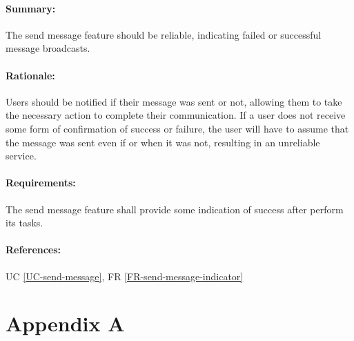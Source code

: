 \documentclass[11pt]{article}
\begin{document}
\paragraph{Summary:} The send message feature should be reliable, indicating failed or successful message broadcasts.
\paragraph{Rationale:} Users should be notified if their message was sent or not, allowing them to take the necessary action to complete their communication. If a user does not receive some form of confirmation of success or failure, the user will have to assume that the message was sent even if or when it was not, resulting in an unreliable service.
\paragraph{Requirements:} The send message feature shall provide some indication of success after perform its tasks.
\paragraph{References:} UC \ref{UC-send-message}, FR \ref{FR-send-message-indicator}


\newpage
\section{Appendix A} \label{appendix-a}
\listoffigures
\end{document}
